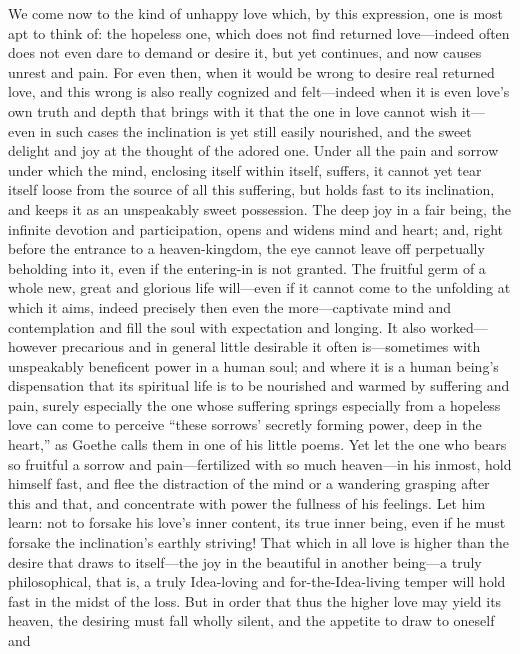 \documentclass[12pt,a4paper]{book}
\begin{document}
We come now to the kind of unhappy love which, by this expression, one is
most apt to think of: the hopeless one, which does not find returned
love---indeed often does not even dare to demand or desire it, but yet
continues, and now causes unrest and pain. For even then, when it would be
wrong to desire real returned love, and this wrong is also really cognized
and felt---indeed when it is even love's own truth and depth that brings
with it that the one in love cannot wish it---even in such cases the
inclination is yet still easily nourished, and the sweet delight and joy at
the thought of the adored one. Under all the pain and sorrow under which
the mind, enclosing itself within itself, suffers, it cannot yet tear
itself loose from the source of all this suffering, but holds fast to its
inclination, and keeps it as an unspeakably sweet possession. The deep joy
in a fair being, the infinite devotion and participation, opens and widens
mind and heart; and, right before the entrance to a heaven-kingdom, the eye
cannot leave off perpetually beholding into it, even if the entering-in is
not granted. The fruitful germ of a whole new, great and glorious life
will---even if it cannot come to the unfolding at which it aims, indeed
precisely then even the more---captivate mind and contemplation and fill the
soul with expectation and longing. It also worked---however precarious and
in general little desirable it often is---sometimes with unspeakably
beneficent power in a human soul; and where it is a human being's
dispensation that its spiritual life is to be nourished and warmed by
suffering and pain, surely especially the one whose suffering springs
especially from a hopeless love can come to perceive ``these sorrows'
secretly forming power, deep in the heart,'' as Goethe calls them in one of
his little poems. Yet let the one who bears so fruitful a sorrow and
pain---fertilized with so much heaven---in his inmost, hold himself fast, and
flee the distraction of the mind or a wandering grasping after this and
that, and concentrate with power the fullness of his feelings. Let him
learn: not to forsake his love's inner content, its true inner being, even
if he must forsake the inclination's earthly striving! That which in all
love is higher than the desire that draws to itself---the joy in the
beautiful in another being---a truly philosophical, that is, a truly
Idea-loving and for-the-Idea-living temper will hold fast in the midst of
the loss. But in order that thus the higher love may yield its heaven, the
desiring must fall wholly silent, and the appetite to draw to oneself and
\end{document}
